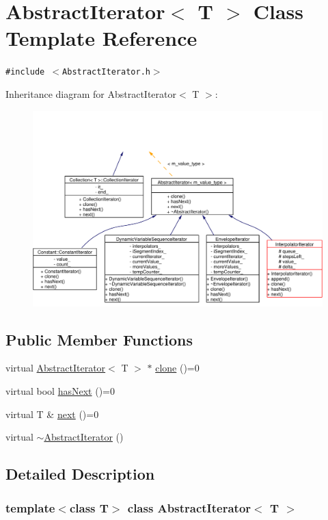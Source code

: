 \hypertarget{classAbstractIterator}{
\section{Abstract\-Iterator$<$ T $>$ Class Template Reference}
\label{classAbstractIterator}
}
{\tt \#include $<$Abstract\-Iterator.h$>$}

Inheritance diagram for Abstract\-Iterator$<$ T $>$:\begin{figure}[H]
\begin{center}
\leavevmode
\includegraphics[width=328pt]{classAbstractIterator__inherit__graph}
\end{center}
\end{figure}
\subsection*{Public Member Functions}
\begin{CompactItemize}
\item 
virtual \hyperlink{classAbstractIterator}{Abstract\-Iterator}$<$ T $>$ $\ast$ \hyperlink{classAbstractIterator_a0}{clone} ()=0
\item 
virtual bool \hyperlink{classAbstractIterator_a1}{has\-Next} ()=0
\item 
virtual T \& \hyperlink{classAbstractIterator_a2}{next} ()=0
\item 
virtual \hyperlink{classAbstractIterator_a3}{$\sim$Abstract\-Iterator} ()
\end{CompactItemize}


\subsection{Detailed Description}
\subsubsection*{template$<$class T$>$ class Abstract\-Iterator$<$ T $>$}

